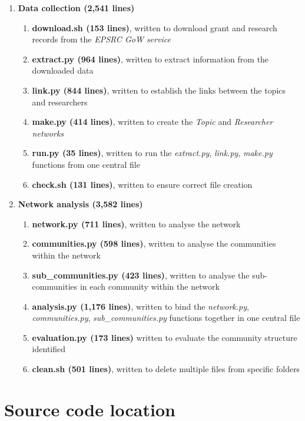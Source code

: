 \begin{enumerate}[noitemsep, label*=\arabic*.]
    \item \textbf{Data collection (2,541 lines)}
\begin{enumerate}[label*=\arabic*.]
    \item \textbf{download.sh (153 lines)}, written to download grant and research records from the \textit{EPSRC GoW service}
    \item \textbf{extract.py (964 lines)}, written to extract information from the downloaded data
    \item \textbf{link.py (844 lines)}, written to establish the links between the topics and researchers
    \item \textbf{make.py (414 lines)}, written to create the \textit{Topic} and \textit{Researcher networks}
    \item \textbf{run.py (35 lines)}, written to run the \textit{extract.py}, \textit{link.py}, \textit{make.py} functions from one central file
    \item \textbf{check.sh (131 lines)}, written to ensure correct file creation
\end{enumerate}
    \item \textbf{Network analysis (3,582 lines)}
\begin{enumerate}[label*=\arabic*.]
    \item \textbf{network.py (711 lines)}, written to analyse the network
    \item \textbf{communities.py (598 lines)}, written to analyse the communities within the network
    \item \textbf{sub\_communities.py (423 lines)}, written to analyse the sub-communities in each community within the network
    \item \textbf{analysis.py (1,176 lines)}, written to bind the \textit{network.py}, \textit{communities.py}, \textit{sub\_communities.py} functions together in one central file
    \item \textbf{evaluation.py (173 lines)} written to evaluate the community structure identified
    \item \textbf{clean.sh (501 lines)}, written to delete multiple files from specific folders
\end{enumerate}
\end{enumerate}

\section{Source code location}

